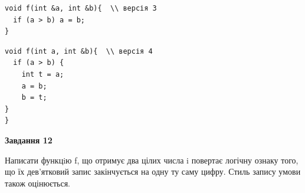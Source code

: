 \documentclass[12pt, ukrainian]{article}
\begin{document}
{\begin {large}
\begin{minipage}[t]{11.0cm}
\vspace{-8mm}\begin{verbatim}
void f(int &a, int &b){  \\ версія 3
  if (a > b) a = b;
}
\end{verbatim}

\vspace{-8mm}\begin{verbatim}
void f(int a, int &b){  \\ версія 4
  if (a > b) {
    int t = a;
    a = b;
    b = t;
}  
}
\end{verbatim}



\begin{center}
\textbf{Завдання 12}
\end{center}

Написати функцiю f, що отримує два цілих числа i повертає логічну ознаку того, що їх дев'ятковий запис закінчується на одну ту саму цифру. Стиль запису умови також оцінюється.\par

\end{minipage}

\end {large}}
\newpage
\end{document}

